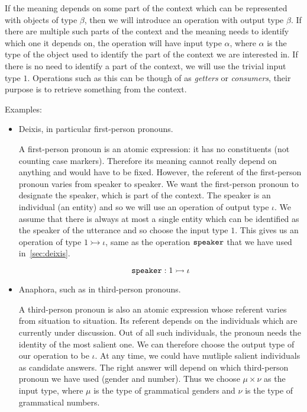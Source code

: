 If the meaning depends on some part of the context which can be represented
with objects of type $\beta$, then we will introduce an operation with
output type $\beta$. If there are multiple such parts of the context and
the meaning needs to identify which one it depends on, the operation will
have input type $\alpha$, where $\alpha$ is the type of the object used to
identify the part of the context we are interested in. If there is no need
to identify a part of the context, we will use the trivial input type
$1$. Operations such as this can be though of as \emph{getters} or
\emph{consumers}, their purpose is to retrieve something from the context.

Examples:

\begin{itemize}
\item Deixis, in particular first-person pronouns.

  A first-person pronoun is an atomic expression: it has no constituents
  (not counting case markers). Therefore its meaning cannot really depend
  on anything and would have to be fixed. However, the referent of the
  first-person pronoun varies from speaker to speaker. We want the
  first-person pronoun to designate the speaker, which is part of the
  context. The speaker is an individual (an entity) and so we will use an
  operation of output type $\iota$. We assume that there is always at most
  a single entity which can be identified as the speaker of the utterance
  and so choose the input type $1$. This gives us an operation of type
  $1 \rightarrowtail \iota$, same as the operation $\mathtt{speaker}$ that we
  have used in~\ref{sec:deixis}.
  
  $$
  \mathtt{speaker} : 1 \rightarrowtail \iota
  $$
  
\item Anaphora, such as in third-person pronouns.

  A third-person pronoun is also an atomic expression whose referent varies
  from situation to situation. Its referent depends on the individuals
  which are currently under discussion. Out of all such individuals, the
  pronoun needs the identity of the most salient one. We can therefore
  choose the output type of our operation to be $\iota$. At any time, we
  could have mutliple salient individuals as candidate answers. The right
  answer will depend on which third-person pronoun we have used (gender and
  number). Thus we choose $\mu \times \nu$ as the input type, where $\mu$
  is the type of grammatical genders and $\nu$ is the type of grammatical
  numbers.
  

\end{itemize}
